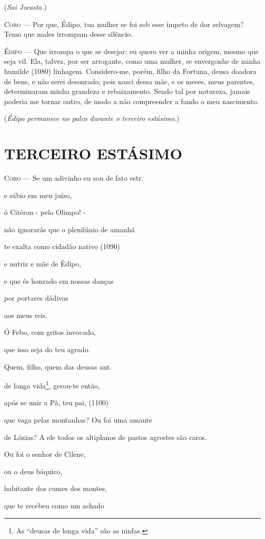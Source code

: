 (\emph{Sai Jocasta.})

\textsc{Coro} --- Por que, Édipo, tua mulher se foi sob esse ímpeto de dor selvagem? Temo
que males irrompam desse silêncio.

\textsc{Édipo} --- Que irrompa o que se desejar; eu quero ver a minha origem, mesmo que
seja vil. Ela, talvez, por ser arrogante, como uma mulher, se envergonhe
de minha humilde (1080) linhagem. Considero-me, porém, filho da Fortuna,
deusa doadora de bens, e não serei desonrado; pois nasci dessa mãe, e os
meses, meus parentes, determinaram minha grandeza e rebaixamento. Sendo
tal por natureza, jamais poderia me tornar outro, de modo a não
compreender a fundo o meu nascimento.

(\emph{Édipo permanece no palco durante o terceiro estásimo.})

\section{TERCEIRO ESTÁSIMO}

\textsc{Coro} --- Se um adivinho eu sou de fato estr.

e sábio em meu juízo,

ó Citéron - pelo Olimpo! -

não ignorarás que o plenilúnio de amanhã

te exalta como cidadão nativo (1090)

e nutriz e mãe de Édipo,

e que és honrado em nossas danças

por portares dádivas

aos meus reis.

Ó Febo, com gritos invocado,

que isso seja do teu agrado.

Quem, filho, quem das deusas ant.

de longa vida\footnote{As ``deusas de longa vida'' são as ninfas.},
gerou-te então,

após se unir a Pã, teu pai, (1100)

que vaga pelas montanhas? Ou foi uma amante

de Lóxias? A ele todos os altiplanos de pastos agrestes são caros.

Ou foi o senhor de Cilene,

ou o deus báquico,

habitante dos cumes dos montes,

que te recebeu como um achado

